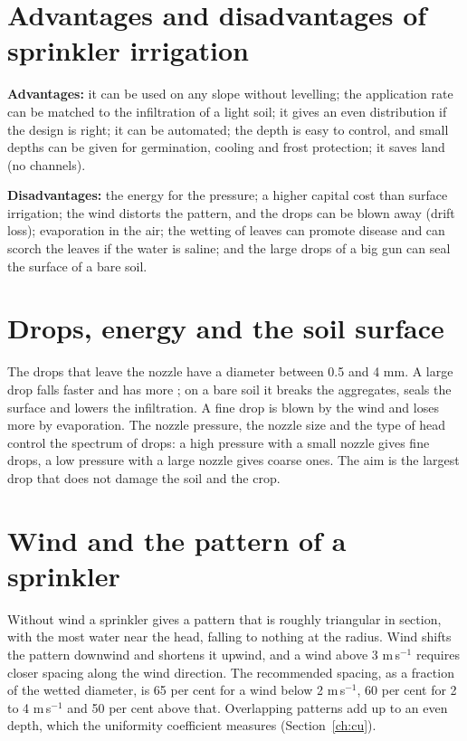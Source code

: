 \section{Advantages and disadvantages of sprinkler irrigation}
\textbf{Advantages:} it can be used on any slope without levelling; the application rate can be matched to the infiltration of a light soil; it gives an even distribution if the design is right; it can be automated; the depth is easy to control, and small depths can be given for germination, cooling and frost protection; it saves land (no channels).
\par\noindent \textbf{Disadvantages:} the energy for the pressure; a higher capital cost than surface irrigation; the wind distorts the pattern, and the drops can be blown away (drift loss); evaporation in the air; the wetting of leaves can promote disease and can scorch the leaves if the water is saline; and the large drops of a big gun can seal the surface of a bare soil.

\section{Drops, energy and the soil surface}
The drops that leave the nozzle have a diameter between 0.5 and 4 mm. A large drop falls faster and has more ; on a bare soil it breaks the aggregates, seals the surface and lowers the infiltration. A fine drop is blown by the wind and loses more by evaporation. The nozzle pressure, the nozzle size and the type of head control the spectrum of drops: a high pressure with a small nozzle gives fine drops, a low pressure with a large nozzle gives coarse ones. The aim is the largest drop that does not damage the soil and the crop.

\section{Wind and the pattern of a sprinkler}
Without wind a sprinkler gives a pattern that is roughly triangular in section, with the most water near the head, falling to nothing at the radius. Wind shifts the pattern downwind and shortens it upwind, and a wind above 3 m\,s$^{-1}$ requires closer spacing along the wind direction. The recommended spacing, as a fraction of the wetted diameter, is 65 per cent for a wind below 2 m\,s$^{-1}$, 60 per cent for 2 to 4 m\,s$^{-1}$ and 50 per cent above that. Overlapping patterns add up to an even depth, which the uniformity coefficient measures (Section~\ref{ch:cu}).

